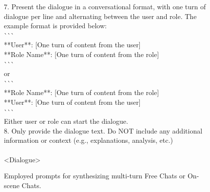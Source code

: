 \begin{figure*}
\begin{tcolorbox}
7. Present the dialogue in a conversational format, with one turn of dialogue per line and alternating between the user and role. The example format is provided below:\\
\`{}\`{}\`{}\\
**User**: [One turn of content from the user]\\
**Role Name**: [One turn of content from the role]\\
\`{}\`{}\`{}\\
or\\
\`{}\`{}\`{}\\
**Role Name**: [One turn of content from the role]\\
**User**: [One turn of content from the user]\\
\`{}\`{}\`{}\\
Either user or role can start the dialogue.\\
8. Only provide the dialogue text. Do NOT include any additional information or context (e.g., explanations, analysis, etc.)\\
\\
<Dialogue>

\end{tcolorbox}
\caption{Employed prompts for synthesizing multi-turn Free Chats or On-scene Chats.}
\label{box:synthesis_1}
\end{figure*}

